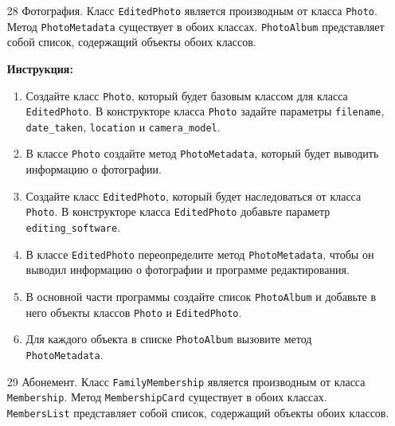 \begin{enumerate}
\item[28]
Фотография. Класс \texttt{EditedPhoto} является производным от класса \texttt{Photo}. Метод \texttt{PhotoMetadata} существует в обоих классах. \texttt{PhotoAlbum} представляет собой список, содержащий объекты обоих классов.

\textbf{Инструкция:}
\begin{enumerate}
    \item Создайте класс \texttt{Photo}, который будет базовым классом для класса \texttt{EditedPhoto}. В конструкторе класса \texttt{Photo} задайте параметры \texttt{filename}, \texttt{date\_taken}, \texttt{location} и \texttt{camera\_model}.
    \item В классе \texttt{Photo} создайте метод \texttt{PhotoMetadata}, который будет выводить информацию о фотографии.
    \item Создайте класс \texttt{EditedPhoto}, который будет наследоваться от класса \texttt{Photo}. В конструкторе класса \texttt{EditedPhoto} добавьте параметр \texttt{editing\_software}.
    \item В классе \texttt{EditedPhoto} переопределите метод \texttt{PhotoMetadata}, чтобы он выводил информацию о фотографии и программе редактирования.
    \item В основной части программы создайте список \texttt{PhotoAlbum} и добавьте в него объекты классов \texttt{Photo} и \texttt{EditedPhoto}.
    \item Для каждого объекта в списке \texttt{PhotoAlbum} вызовите метод \texttt{PhotoMetadata}.
\end{enumerate}

\item[29]
Абонемент. Класс \texttt{FamilyMembership} является производным от класса \texttt{Membership}. Метод \texttt{MembershipCard} существует в обоих классах. \texttt{MembersList} представляет собой список, содержащий объекты обоих классов.


\end{enumerate}
